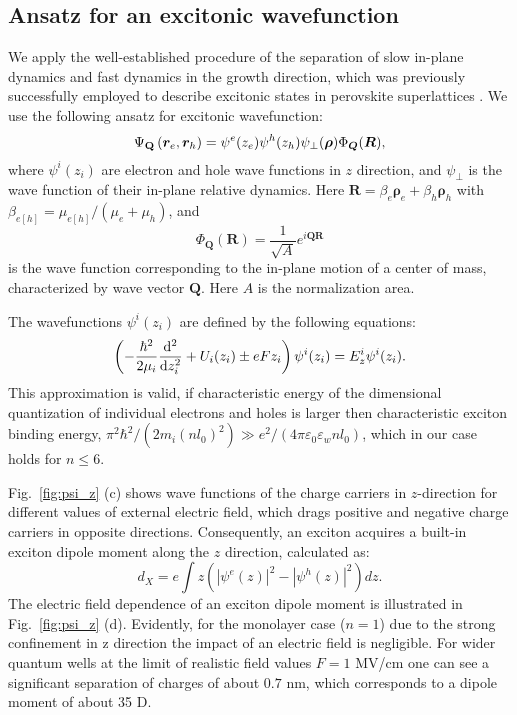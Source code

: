 \documentclass[prb,twocolumn,preprintnumbers,superscriptaddress]{revtex4}
\begin{document}
\subsection{Ansatz for an excitonic wavefunction}

We apply the well-established procedure of the separation of slow in-plane dynamics and fast dynamics in the growth direction, which was previously successfully employed to describe excitonic states in perovskite superlattices \cite{Muljarov1995}. 
We use the following ansatz for excitonic wavefunction:
%
\begin{equation}
    \label{eq:xciton_wf}
    \Psi_{\bf Q} \left( {\bm r}_e,{\bm r}_h \right) = \psi^e(z_e) \psi^h (z_h) \psi_{\perp} ({\bm \rho}) \Phi_{\bm Q}({\bm R}),
\end{equation}
%
where $\psi^i(z_i)$ are electron and hole wave functions in $z$ direction, and $\psi_{\perp}$ is the wave function of their in-plane relative dynamics.  Here ${\bm R} = \beta_e {\bm \rho_e} + \beta_h {\bm \rho_h}$ with $\beta_{e[h]} = \mu_{e[h]}/(\mu_e+\mu_h)$, and
%
\begin{equation}
    \Phi_{\bm Q}\left( {\bm R} \right) = \frac{1}{\sqrt{A}} e^{i {\bm Q} {\bm R} }
\end{equation}
%
is the wave function corresponding to the in-plane motion of a center of mass, characterized by wave vector ${\bm Q}$. Here $A$ is the normalization area. 

The wavefunctions $\psi^i(z_i)$ are defined by the following equations:
%
\begin{align}
    \label{eq:Schro_z}
    \left( - \frac{\hbar^2}{2\mu_i} \frac{{\rm d}^2}{{\rm d} z_i^2} 
    + U_i (z_i) \pm eF z_i \right) \psi ^i ( z_i)
    = E_z^i \psi^i( z_i).
\end{align}
%
This approximation is valid, if characteristic energy of the dimensional quantization of individual electrons and holes is larger then characteristic exciton binding energy, 
$\pi^2 \hbar^2 / (2 m_i (nl_0)^2) \gg e^2 / (4\pi\varepsilon_0\varepsilon_w n l_0) $, which in our case holds for $n\leq 6$. 

Fig.~\ref{fig:psi_z} (c) shows  wave functions of the charge carriers in $z$-direction for different values of external electric field, which drags positive and negative charge carriers in opposite directions. Consequently, an exciton acquires a built-in exciton dipole moment along the $z$ direction, calculated as:
%
\begin{equation}
    d_X = e \int z \left( \left| \psi^e (z) \right|^2 - \left| \psi^h(z) \right|^2 \right)  dz.
\end{equation}
%
The electric field dependence of an exciton dipole moment is illustrated in Fig.~\ref{fig:psi_z} (d).
Evidently, for the monolayer case ($n=1$) due to the strong confinement in z direction the impact of an electric field is negligible.
For wider quantum wells at the limit of realistic field values $F = 1$ MV/cm one can see a significant separation of charges of about $0.7$ nm, which corresponds to a dipole moment of about 35 D.
\end{document}
